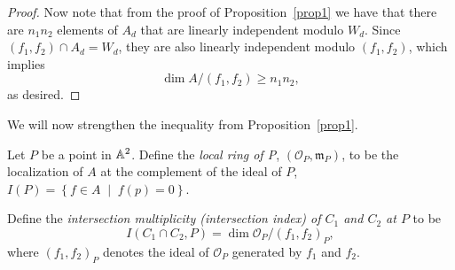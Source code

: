 \documentclass[10pt]{amsart}
\begin{document}
\begin{prop}
\begin{proof}
		Now note that from the proof of Proposition~\ref{prop1} we have that there are $n_1n_2$ elements of $A_d$ that are linearly independent modulo $W_d$.
		Since $(f_1, f_2) \cap A_d = W_d$, they are also linearly independent modulo $(f_1, f_2)$, which implies
			$$\dim A/(f_1,f_2) \geq n_1n_2,$$
		as desired.
	\end{proof}
\end{prop}

We will now strengthen the inequality from Proposition~\ref{prop1}.  

\begin{defn}\label{localringpoint}
	Let $P$ be a point in $\mathbb{A}^2$.
	Define the {\it local ring of P}, $(\mathcal{O}_P, \mathfrak{m}_P)$, to be the localization of $A$ at the complement of the ideal of $P$, $I(P) = \left\{f \in A \;\middle\vert\; f(p) = 0 \right\}$.
\end{defn}

\begin{defn}\label{intmult}
	Define the {\it intersection multiplicity (intersection index) of $C_1$ and $C_2$ at $P$} to be
		$$I(C_1 \cap C_2, P) = \dim \mathcal{O}_P/(f_1, f_2)_P,$$
	where $(f_1, f_2)_P$ denotes the ideal of $\mathcal{O}_P$ generated by $f_1$ and $f_2$.
\end{defn}
\end{document}
